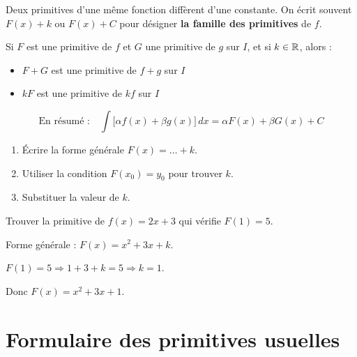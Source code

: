 \begin{remarque}
  Deux primitives d'une m\^{e}me fonction diff\`{e}rent d'une constante.
  On \'{e}crit souvent $F(x) + k$ ou $F(x) + C$ pour d\'{e}signer
  \textbf{la famille des primitives} de $f$.
\end{remarque}

\begin{propriete}
  Si $F$ est une primitive de $f$ et $G$ une primitive de $g$ sur $I$,
  et si $k \in \mathbb{R}$, alors :
  \begin{itemize}
    \item $F + G$ est une primitive de $f + g$ sur $I$
    \item $kF$ est une primitive de $kf$ sur $I$
  \end{itemize}
  \[
    \text{En r\'{e}sum\'{e} :} \quad
    \int \bigl[\alpha f(x) + \beta g(x)\bigr]\,dx
    = \alpha F(x) + \beta G(x) + C
  \]
\end{propriete}

\begin{methode}
  \begin{enumerate}
    \item \'{E}crire la forme g\'{e}n\'{e}rale $F(x) = \ldots + k$.
    \item Utiliser la condition $F(x_0) = y_0$ pour trouver $k$.
    \item Substituer la valeur de $k$.
  \end{enumerate}
\end{methode}

\begin{exemple}
  Trouver la primitive de $f(x) = 2x + 3$ qui v\'{e}rifie $F(1) = 5$.

  \medskip
  Forme g\'{e}n\'{e}rale : $F(x) = x^2 + 3x + k$.

  $F(1) = 5 \Rightarrow 1 + 3 + k = 5 \Rightarrow k = 1$.

  Donc $F(x) = x^2 + 3x + 1$.
\end{exemple}

\section{Formulaire des primitives usuelles}

